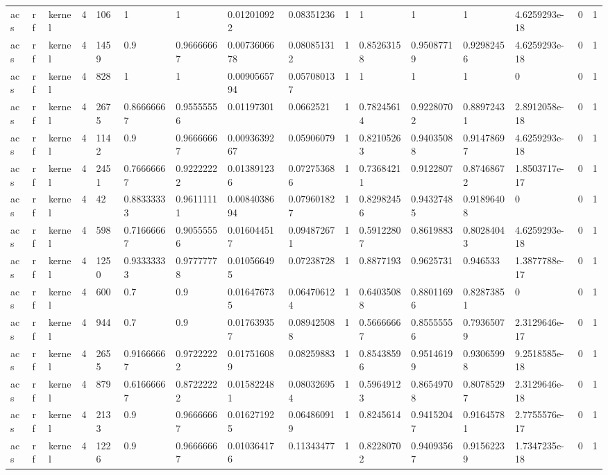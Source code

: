 \begin{tabular}{llllllllllllllll}
acs & rf & kernel & 4 & 106 & 1 & 1 & 0.012010922 & 0.08351236 & 1 & 1 & 1 & 1 & 4.6259293e-18 & 0 & 1 \\
acs & rf & kernel & 4 & 1459 & 0.9 & 0.96666667 & 0.0073606678 & 0.080851312 & 1 & 0.85263158 & 0.95087719 & 0.92982456 & 4.6259293e-18 & 0 & 1 \\
acs & rf & kernel & 4 & 828 & 1 & 1 & 0.0090565794 & 0.057080137 & 1 & 1 & 1 & 1 & 0 & 0 & 1 \\
acs & rf & kernel & 4 & 2675 & 0.86666667 & 0.95555556 & 0.01197301 & 0.0662521 & 1 & 0.78245614 & 0.92280702 & 0.88972431 & 2.8912058e-18 & 0 & 1 \\
acs & rf & kernel & 4 & 1142 & 0.9 & 0.96666667 & 0.0093639267 & 0.05906079 & 1 & 0.82105263 & 0.94035088 & 0.91478697 & 4.6259293e-18 & 0 & 1 \\
acs & rf & kernel & 4 & 2451 & 0.76666667 & 0.92222222 & 0.013891236 & 0.072753686 & 1 & 0.73684211 & 0.9122807 & 0.87468672 & 1.8503717e-17 & 0 & 1 \\
acs & rf & kernel & 4 & 42 & 0.88333333 & 0.96111111 & 0.0084038694 & 0.079601827 & 1 & 0.82982456 & 0.94327485 & 0.91896408 & 0 & 0 & 1 \\
acs & rf & kernel & 4 & 598 & 0.71666667 & 0.90555556 & 0.016044517 & 0.094872671 & 1 & 0.59122807 & 0.8619883 & 0.80284043 & 4.6259293e-18 & 0 & 1 \\
acs & rf & kernel & 4 & 1250 & 0.93333333 & 0.97777778 & 0.010566495 & 0.07238728 & 1 & 0.8877193 & 0.9625731 & 0.946533 & 1.3877788e-17 & 0 & 1 \\
acs & rf & kernel & 4 & 600 & 0.7 & 0.9 & 0.016476735 & 0.064706124 & 1 & 0.64035088 & 0.88011696 & 0.82873851 & 0 & 0 & 1 \\
acs & rf & kernel & 4 & 944 & 0.7 & 0.9 & 0.017639357 & 0.089425088 & 1 & 0.56666667 & 0.85555556 & 0.79365079 & 2.3129646e-17 & 0 & 1 \\
acs & rf & kernel & 4 & 2655 & 0.91666667 & 0.97222222 & 0.017516089 & 0.08259883 & 1 & 0.85438596 & 0.95146199 & 0.93065998 & 9.2518585e-18 & 0 & 1 \\
acs & rf & kernel & 4 & 879 & 0.61666667 & 0.87222222 & 0.015822481 & 0.080326954 & 1 & 0.59649123 & 0.86549708 & 0.80785297 & 2.3129646e-18 & 0 & 1 \\
acs & rf & kernel & 4 & 2133 & 0.9 & 0.96666667 & 0.016271925 & 0.064860919 & 1 & 0.8245614 & 0.94152047 & 0.91645781 & 2.7755576e-17 & 0 & 1 \\
acs & rf & kernel & 4 & 1226 & 0.9 & 0.96666667 & 0.010364176 & 0.11343477 & 1 & 0.82280702 & 0.94093567 & 0.91562239 & 1.7347235e-18 & 0 & 1 \\

\end{tabular}
